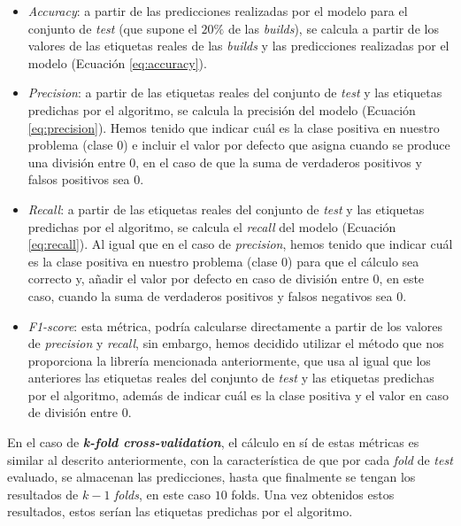 \begin{itemize}
    \item \textit{Accuracy}: a partir de las predicciones realizadas por el modelo para el
    conjunto de \textit{test} (que supone el $20\%$ de las \textit{builds}), se calcula a
    partir de los valores de las etiquetas reales de las \textit{builds} y las predicciones
    realizadas por el modelo (Ecuación \eqref{eq:accuracy}).\\

    \item \textit{Precision}: a partir de las etiquetas reales del conjunto de \textit{test} y
    las etiquetas predichas por el algoritmo, se calcula la precisión del modelo
    (Ecuación \eqref{eq:precision}). Hemos tenido que indicar cuál es la clase positiva en nuestro problema
    (clase 0) e incluir el valor por defecto que asigna cuando se produce una división entre $0$,
    en el caso de que la suma de verdaderos positivos y falsos positivos sea $0$.\\

    \item \textit{Recall}: a partir de las etiquetas reales del conjunto de \textit{test} y las
    etiquetas predichas por el algoritmo, se calcula el \textit{recall} del modelo
    (Ecuación  \eqref{eq:recall}). Al igual que en el caso de \textit{precision}, hemos tenido que indicar
    cuál es la clase positiva en nuestro problema (clase 0) para que el cálculo sea correcto y,
    añadir el valor por defecto en caso de división entre $0$, en este caso, cuando la suma de
    verdaderos positivos y falsos negativos sea $0$.\\

    \item \textit{F1-score}: esta métrica, podría calcularse directamente a partir de los valores
    de \textit{precision} y \textit{recall}, sin embargo, hemos decidido utilizar el método que
    nos proporciona la librería mencionada anteriormente, que usa al igual que los anteriores las
    etiquetas reales del conjunto de \textit{test} y las etiquetas predichas por el algoritmo,
    además de indicar cuál es la clase positiva y el valor en caso de división entre $0$.\\
\end{itemize}

En el caso de \textbf{\textit{k-fold cross-validation}}, el cálculo en sí de estas métricas
es similar al descrito anteriormente, con la característica de que por cada \textit{fold} de
\textit{test} evaluado, se almacenan las predicciones, hasta que finalmente se tengan los
resultados de $k-1$ \textit{folds}, en este caso $10$ folds. Una vez obtenidos estos resultados,
estos serían las etiquetas predichas por el algoritmo.

